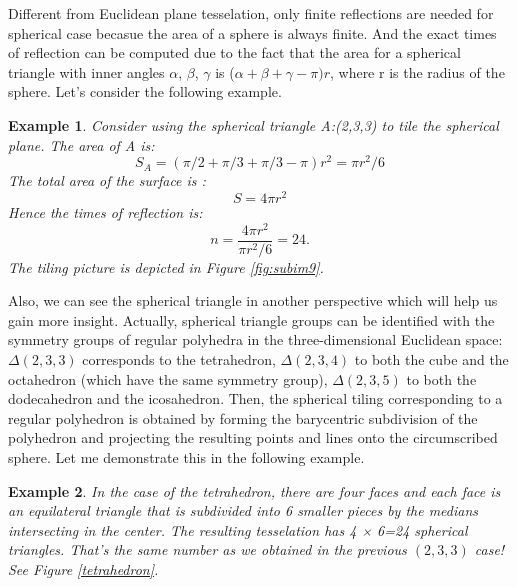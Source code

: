 \documentclass{article}
\newtheorem{Ex}{Example}[section]
\begin{document}
Different from Euclidean plane tesselation, only finite reflections are needed for spherical case becasue the area of a sphere is always finite. And the exact times of reflection can be computed due to the fact that the area for a spherical triangle with inner angles $\alpha$, $\beta$, $\gamma$ is ($\alpha + \beta + \gamma - \pi)r$, where r is the radius of the sphere. Let's consider the following example.
\begin{Ex}
    Consider using the spherical triangle A:(2,3,3) to tile the spherical plane.
    The area of A is: $$S_A = (\pi/2+\pi/3+\pi/3-\pi)r^2=\pi r^2/6$$
    The total area of the surface is : $$S= 4\pi r^2$$
    Hence the times of reflection is: $$n=\frac{ 4\pi r^2}{\pi r^2/6}=24.$$
    The tiling picture is depicted in Figure \ref{fig:subim9}.
\end{Ex}

Also, we can see the spherical triangle in another perspective which will help us gain more insight.
Actually, spherical triangle groups can be identified with the symmetry groups of regular polyhedra in the three-dimensional Euclidean space: $\Delta(2,3,3)$ corresponds to the tetrahedron, $\Delta(2,3,4)$ to both the cube and the octahedron (which have the same symmetry group), $\Delta(2,3,5)$ to both the dodecahedron and the icosahedron. Then, the spherical tiling corresponding to a regular polyhedron is obtained by forming the barycentric subdivision of the polyhedron and projecting the resulting points and lines onto the circumscribed sphere. Let me demonstrate this in the following example.
\begin{Ex}
    In the case of the tetrahedron, there are four faces and each face is an equilateral triangle that is subdivided into 6 smaller pieces by the medians intersecting in the center. The resulting tesselation has 4 × 6=24 spherical triangles. That's the same number as we obtained in the previous $(2, 3, 3)$ case! See Figure \ref{tetrahedron}.
\end{Ex}
\end{document}
